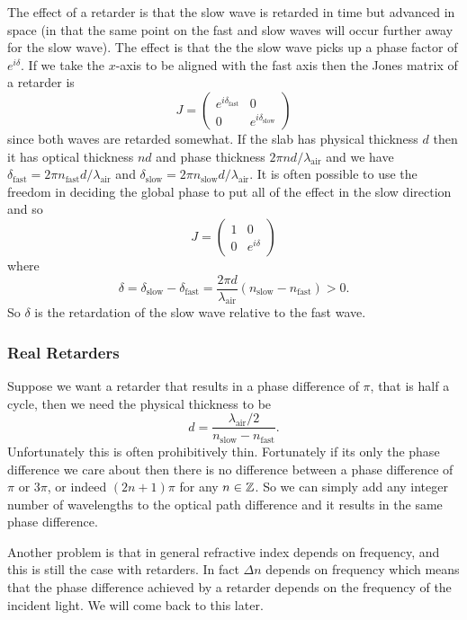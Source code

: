     The effect of a retarder is that the slow wave is retarded in time but advanced in space (in that the same point on the fast and slow waves will occur further away for the slow wave).
    The effect is that the the slow wave picks up a phase factor of \(e^{i\delta}\).
    If we take the \(x\)-axis to be aligned with the fast axis then the Jones matrix of a retarder is
    \[
        J = 
        \begin{pmatrix}
            e^{i\delta_{\text{fast}}} & 0\\
            0 & e^{i\delta_{\text{slow}}}
        \end{pmatrix}
    \]
    since both waves are retarded somewhat.
    If the slab has physical thickness \(d\) then it has optical thickness \(nd\) and phase thickness \(2\pi nd/\lambda_{\text{air}}\) and we have \(\delta_{\text{fast}} = 2\pi n_{\text{fast}}d/\lambda_{\text{air}}\) and \(\delta_{\text{slow}} = 2\pi n_{\text{slow}}d/\lambda_{\text{air}}\).
    It is often possible to use the freedom in deciding the global phase to put all of the effect in the slow direction and so
    \[
        J = 
        \begin{pmatrix}
            1 & 0\\
            0 & e^{i\delta}
        \end{pmatrix}
    \]
    where
    \[\delta = \delta_{\text{slow}} - \delta_{\text{fast}} = \frac{2\pi d}{\lambda_{\text{air}}}(n_{\text{slow}} - n_{\text{fast}}) > 0.\]
    So \(\delta\) is the retardation of the slow wave relative to the fast wave.
    
    \subsubsection{Real Retarders}
    Suppose we want a retarder that results in a phase difference of \(\pi\), that is half a cycle, then we need the physical thickness to be
    \[d = \frac{\lambda_{\mathrm{air}}/2}{n_{\text{slow}} - n_{\text{fast}}}.\]
    Unfortunately this is often prohibitively thin.
    Fortunately if its only the phase difference we care about then there is no difference between a phase difference of \(\pi\) or \(3\pi\), or indeed \((2n + 1)\pi\) for any \(n \in \mathbb{Z}\).
    So we can simply add any integer number of wavelengths to the optical path difference and it results in the same phase difference.
    
    Another problem is that in general refractive index depends on frequency, and this is still the case with retarders.
    In fact \(\Delta n\) depends on frequency which means that the phase difference achieved by a retarder depends on the frequency of the incident light.
    We will come back to this later.
    
